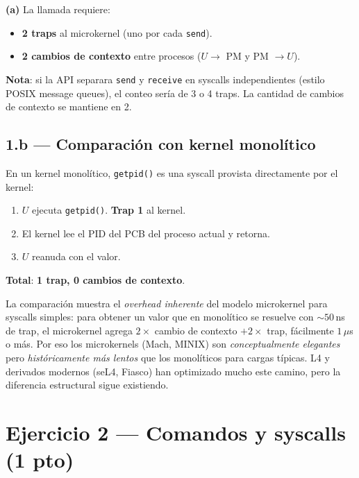 \documentclass[11pt,a4paper]{article}
\begin{document}
\begin{respuesta}
\textbf{(a)} La llamada requiere:

\begin{itemize}[leftmargin=*,nosep]
    \item \textbf{2 traps} al microkernel (uno por cada \texttt{send}).
    \item \textbf{2 cambios de contexto} entre procesos
        ($U \to$ PM y PM $\to U$).
\end{itemize}

\textbf{Nota}: si la API separara \texttt{send} y \texttt{receive}
en syscalls independientes (estilo POSIX message queues), el conteo
sería de 3 o 4 traps. La cantidad de cambios de contexto se mantiene
en 2.
\end{respuesta}

\subsection*{1.b --- Comparación con kernel monolítico}

En un kernel monolítico, \texttt{getpid()} es una syscall provista
directamente por el kernel:

\begin{enumerate}[leftmargin=*,nosep]
    \item $U$ ejecuta \texttt{getpid()}. \textbf{Trap 1} al kernel.
    \item El kernel lee el PID del PCB del proceso actual y retorna.
    \item $U$ reanuda con el valor.
\end{enumerate}

\textbf{Total}: \textbf{1 trap, 0 cambios de contexto}.

\begin{idea}
La comparación muestra el \emph{overhead inherente} del modelo
microkernel para syscalls simples: para obtener un valor que en
monolítico se resuelve con $\sim 50$\,ns de trap, el microkernel
agrega $2 \times$ cambio de contexto $+ 2 \times$ trap, fácilmente
$1$\,$\mu$s o más. Por eso los microkernels (Mach, MINIX) son
\emph{conceptualmente elegantes} pero \emph{históricamente más
lentos} que los monolíticos para cargas típicas. L4 y derivados
modernos (seL4, Fiasco) han optimizado mucho este camino, pero la
diferencia estructural sigue existiendo.
\end{idea}

\section{Ejercicio 2 --- Comandos y syscalls (1 pto)}
\end{document}
